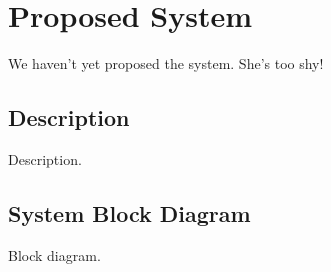 \section{Proposed System}

We haven't yet proposed the system. She's too shy!

\subsection{Description}

Description.

\subsection{System Block Diagram}

Block diagram.
